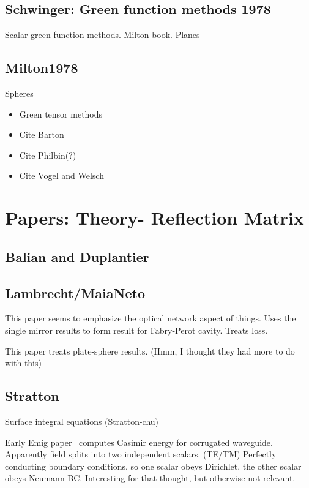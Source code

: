 \subsection{Schwinger: Green function methods 1978}

\cite{Schwinger1978, Milton1978}

Scalar green function methods.  Milton book.  
Planes

\subsection{Milton1978}
Spheres

\begin{itemize}
\item Green tensor methods
\item Cite Barton
\item Cite Philbin(?)
\item Cite Vogel and Welsch
\end{itemize}

\section{Papers: Theory- Reflection Matrix}

\subsection{Balian and Duplantier}
\cite{Balian1977} \cite{Balian1978}
\subsection{Lambrecht/MaiaNeto}

\cite{Lambrecht2006}
This paper seems to emphasize the optical network aspect of things.  
Uses the single mirror results to form result for Fabry-Perot cavity.
Treats loss.  

\cite{MaiaNeto2008}
This paper treats plate-sphere results.  (Hmm, I thought they had more to do with this)

\cite{Canaguier-Durand2012}

\subsection{Stratton}
Surface integral equations (Stratton-chu)
\cite{Stratton1941}

Early Emig paper~\cite{Emig2001} computes Casimir energy for corrugated waveguide.
Apparently field splits into two independent scalars.  (TE/TM)
Perfectly conducting boundary conditions, so one scalar obeys Dirichlet, 
the other scalar obeys Neumann BC.
  Interesting for that thought, but otherwise not relevant.  

